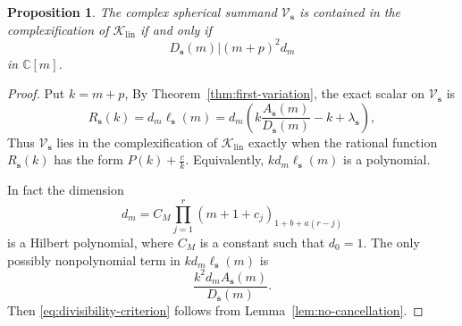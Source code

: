 \documentclass[11pt,reqno]{amsart}
\theoremstyle{corollary}
\theoremstyle{conjecture}
\theoremstyle{assumption}
\theoremstyle{proposition}
\newtheorem{proposition}[theorem]{Proposition}
\theoremstyle{remark}
\numberwithin{equation}{section}
\begin{document}
\begin{proposition}\label{prop:divisibility-criterion}
The complex spherical summand $\mathcal V_{\mathbf s}$ is contained in the complexification of $\mathcal K_{\operatorname{lin}}$ if and only if
\begin{equation}\label{eq:divisibility-criterion}
D_{\mathbf s}(m) \mathrel{\big |} (m+p)^2d_m
\end{equation}
in $\mathbb{C}[m]$.
\end{proposition}
\begin{proof}
Put $k=m+p$, By Theorem~\ref{thm:first-variation}, the exact scalar on $\mathcal V_{\mathbf s}$ is
\begin{equation}\label{eq:notation-spherical-scalar}
R_{\mathbf s}(k)=d_{m}\ell_{\mathbf s}(m)=d_m\left(k\frac{A_{\mathbf s}(m)}{D_{\mathbf s}(m) } -k+\lambda_{\mathbf s}\right),
\end{equation}
Thus $\mathcal V_{\mathbf s}$ lies in the complexification of $\mathcal K_{\operatorname{lin}}$ exactly when the rational function $R_{\mathbf s}(k)$ has the form $P(k)+\frac{c}{k}$. Equivalently, $kd_m\ell_{\mathbf s}(m)$ is a polynomial. 

In fact the dimension
\begin{equation}\label{eq:dimension-polynomial}
d_m=C_M\prod_{j=1}^{r}(m+1+c_j)_{1+b+a(r-j)}
\end{equation}
is a Hilbert polynomial, where $C_M$ is a constant such that $d_0=1$. The only possibly nonpolynomial term in $kd_m\ell_{\mathbf s}(m)$ is
\[
\frac{k^2d_mA_{\mathbf s}(m)}{D_{\mathbf s}(m)}.
\]
Then \eqref{eq:divisibility-criterion} follows from Lemma~\ref{lem:no-cancellation}.
\end{proof}
\end{document}
